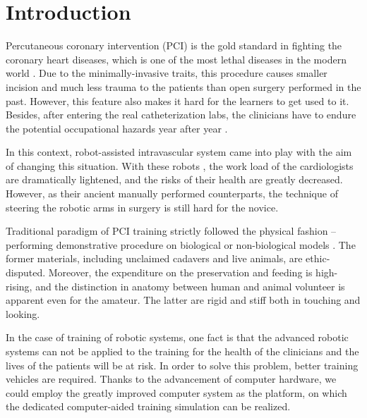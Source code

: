 
\section{Introduction}
\label{sec6_1}

Percutaneous coronary intervention (PCI) is the gold standard in fighting the coronary heart diseases, which is one of the most lethal diseases in the modern world \cite{WHO2013}. %
Due to the minimally-invasive traits, this procedure causes smaller incision and much less trauma to the patients than open surgery performed in the past.
However, this feature also makes it hard for the learners to get used to it.
Besides, after entering the real catheterization labs, the clinicians have to endure the potential occupational hazards year after year \cite{Smilowitz2012}.

In this context, robot-assisted intravascular system came into play with the aim of changing this situation.
With these robots \cite{Beyar2006RNS,Smilowitz2012}, the work load of the cardiologists are dramatically lightened, and the risks of their health are greatly decreased.
However, as their ancient manually performed counterparts, the technique of steering the robotic arms in surgery is still hard for the novice.

Traditional paradigm of PCI training strictly followed the physical fashion -- performing demonstrative procedure on biological or non-biological models \cite{Lunderquist1995,Mori1998}. %
The former materials, including unclaimed cadavers and live animals, are ethic-disputed.
Moreover, the expenditure on the preservation and feeding is high-rising, and the distinction in anatomy between human and animal volunteer is apparent even for the amateur. %
The latter are rigid and stiff both in touching and looking.

In the case of training of robotic systems, one fact is that the advanced robotic systems can not be applied to the training for the health of the clinicians and the lives of the patients will be at risk. %
In order to solve this problem, better training vehicles are required.
Thanks to the advancement of computer hardware, we could employ the greatly improved computer system as the platform, on which the dedicated computer-aided training simulation can be realized. %

